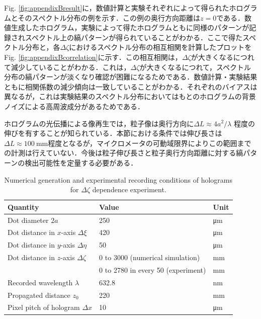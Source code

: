 Fig. \ref{fig:appendixBresult}に，数値計算と実験それぞれによって得られたホログラムとそのスペクトル分布の例を示す．この例の奥行方向距離は$z=0$である．数値生成したホログラム，実験によって得たホログラムともに同様のパターンが記録されスペクトル上の縞パターンが得られていることがわかる．ここで得たスペクトル分布と，各$\Delta \zeta$におけるスペクトル分布の相互相関を計算したプロットをFig. \ref{fig:appendixBcorrelation}に示す．この相互相関は，$\Delta \zeta$が大きくなるにつれて減少していることがわかる．これは，$\Delta \zeta$が大きくなるにつれて，スペクトル分布の縞パターンが淡くなり確認が困難になるためである．数値計算・実験結果ともに相関係数の減少傾向は一致していることがわかる．それぞれのバイアスは異なるが，これは実験結果のスペクトル分布においてはもとのホログラムの背景ノイズによる高周波成分があるためである．

ホログラムの光伝播による像再生では，粒子像は奥行方向に$\Delta L \approx 4a^2/\lambda$ 程度の伸びを有することが知られている．本節における条件では伸び長さは$\Delta L \approx \SI{100}{\mm}$程度となるが，マイクロメータの可動域限界によりこの範囲までの計測は行えていない．今後は粒子伸び長さと粒子奥行方向距離に対する縞パターンの検出可能性を定量する必要がある．

\begin{table}[H]
    \centering
    \caption{Numerical generation and experimental recording conditions of holograms for $\Delta \zeta$ dependence experiment.}
    \label{table:appendixBcondition}
    \begin{tabular}{lll}
    Quantity                               & Value                                             & Unit     \\ \hline \hline
    Dot diameter $2a$                      & 250                                               & \si{\um} \\ \hline
    Dot distance in $x$-axis $\Delta \xi$  & 420                                               & \si{\um} \\ \hline
    Dot distance in $y$-axis $\Delta \eta$ & 50                                                & \si{\um} \\ \hline 
    Dot distance in $z$-axis $\Delta \zeta$& 0 to 3000 (numerical simulation)                  & \si{\mm} \\ 
                                           & 0 to 2780 in every 50 (experiment)                & \si{\mm} \\ \hline 
    Recorded wavelength $\lambda$          & 632.8                                             & \si{\nm} \\ \hline
    Propagated distance $z_0$              & 220                                               & \si{\mm} \\ \hline
    Pixel pitch of hologram $\Delta x$     & 10                                                & \si{\um}
    \end{tabular}
\end{table}


